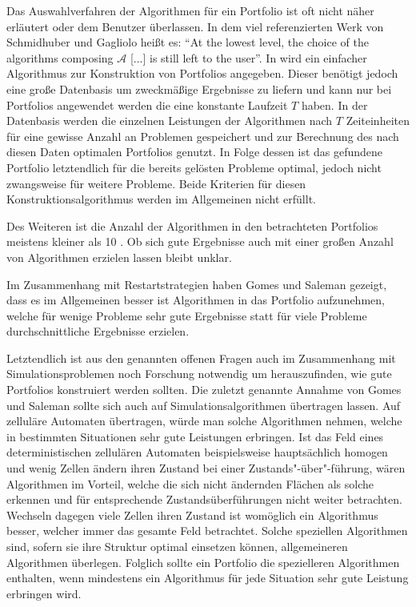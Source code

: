 Das Auswahlverfahren der Algorithmen für ein Portfolio ist oft nicht näher erläutert oder dem Benutzer überlassen. In dem viel referenzierten Werk von Schmidhuber und Gagliolo \cite{gaglioloschmidhuber06} heißt es: "`At the lowest level, the choice of the algorithms composing $\mathcal{A}$ [...] is still left to the user"'. In \cite{fukunaga99} wird ein einfacher Algorithmus zur Konstruktion von Portfolios angegeben. Dieser benötigt jedoch eine große Datenbasis um zweckmäßige Ergebnisse zu liefern und kann nur bei Portfolios angewendet werden die eine konstante Laufzeit $T$ haben. In der Datenbasis werden die einzelnen Leistungen der Algorithmen nach $T$ Zeiteinheiten für eine gewisse Anzahl an Problemen gespeichert und zur Berechnung des nach diesen Daten optimalen Portfolios genutzt. In Folge dessen ist das gefundene Portfolio letztendlich für die bereits gelösten Probleme optimal, jedoch nicht zwangsweise für weitere Probleme. Beide Kriterien für diesen Konstruktionsalgorithmus werden im Allgemeinen nicht erfüllt.

Des Weiteren ist die Anzahl der Algorithmen in den betrachteten Portfolios meistens kleiner als 10 \cite{fukunaga99, gomesselman97}. Ob sich gute Ergebnisse auch mit einer großen Anzahl von Algorithmen erzielen lassen bleibt unklar.

Im Zusammenhang mit Restartstrategien haben Gomes und Saleman \cite{gomesselman97} gezeigt, dass es im Allgemeinen besser ist Algorithmen in das Portfolio aufzunehmen, welche für wenige Probleme sehr gute Ergebnisse statt für viele Probleme durchschnittliche Ergebnisse erzielen.

Letztendlich ist aus den genannten offenen Fragen auch im Zusammenhang mit Simulationsproblemen noch Forschung notwendig um herauszufinden, wie gute Portfolios konstruiert werden sollten. Die zuletzt genannte Annahme von Gomes und Saleman sollte sich auch auf Simulationsalgorithmen übertragen lassen. Auf zelluläre Automaten übertragen, würde man solche Algorithmen nehmen, welche in bestimmten Situationen sehr gute Leistungen erbringen. Ist das Feld eines deterministischen zellulären Automaten beispielsweise hauptsächlich homogen und wenig Zellen ändern ihren Zustand bei einer Zustands"-über"-führung, wären Algorithmen im Vorteil, welche die sich nicht ändernden Flächen als solche erkennen und für entsprechende Zustandsüberführungen nicht weiter betrachten. Wechseln dagegen viele Zellen ihren Zustand ist womöglich ein Algorithmus besser, welcher immer das gesamte Feld betrachtet. Solche speziellen Algorithmen sind, sofern sie ihre Struktur optimal einsetzen können, allgemeineren Algorithmen überlegen. Folglich sollte ein Portfolio die spezielleren Algorithmen enthalten, wenn mindestens ein Algorithmus für jede Situation sehr gute Leistung erbringen wird.

